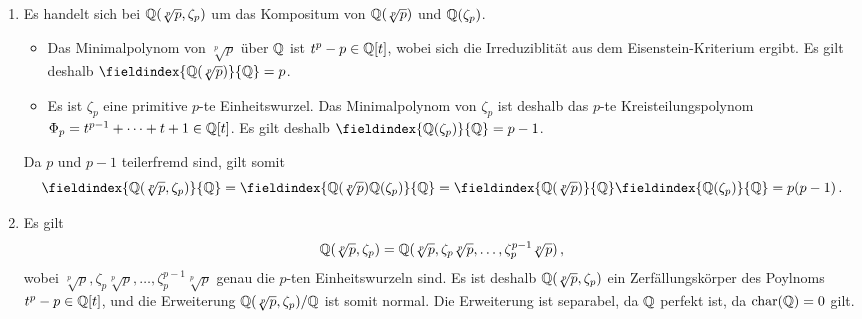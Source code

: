 \documentclass[a4paper, 10pt]{scrartcl}
\begin{document}
\begin{solution}
  \begin{enumerate}
    \item
      Es handelt sich bei $\mathbb{Q}(\sqrt[p]{p}, \zeta_p)$ um das Kompositum von $\mathbb{Q}(\sqrt[p]{p})$ und $\mathbb{Q}(\zeta_p)$.
      \begin{itemize}
        \item
          Das Minimalpolynom von $\sqrt[p]{p}$ über $\mathbb{Q}$ ist $t^p - p \in \mathbb{Q}[t]$, wobei sich die Irreduziblität aus dem Eisenstein-Kriterium ergibt.
          Es gilt deshalb $\fieldindex{\Rational(\sqrt[p]{p})}{\Rational} = p$.
        \item
          Es ist $\zeta_p$ eine primitive $p$-te Einheitswurzel.
          Das Minimalpolynom von $\zeta_p$ ist deshalb das $p$-te Kreisteilungspolynom $\Phi_p = t^{p-1} + \dotsb + t + 1 \in \mathbb{Q}[t]$.
          Es gilt deshalb $\fieldindex{\Rational(\zeta_p)}{\Rational} = p-1$.
      \end{itemize}
      Da $p$ und $p-1$ teilerfremd sind, gilt somit
      \[
          \fieldindex{\Rational(\sqrt[p]{p}, \zeta_p)}{\Rational}
        = \fieldindex{\Rational(\sqrt[p]{p}) \Rational(\zeta_p)}{\Rational}
        = \fieldindex{\Rational(\sqrt[p]{p})}{\Rational} \fieldindex{\Rational(\zeta_p)}{\Rational}
        = p(p-1) \,.
      \]
    \item
      Es gilt
      \[
          \mathbb{Q}(\sqrt[p]{p}, \zeta_p)
        = \mathbb{Q}(\sqrt[p]{p}, \zeta_p \sqrt[p]{p}, \dotsc, \zeta_p^{p-1} \sqrt[p]{p}) \,,
      \]
      wobei $\sqrt[p]{p}, \zeta_p \sqrt[p]{p}, \dotsc, \zeta_p^{p-1} \sqrt[p]{p}$ genau die $p$-ten Einheitswurzeln sind.
      Es ist deshalb $\mathbb{Q}(\sqrt[p]{p}, \zeta_p)$ ein Zerfällungskörper des Poylnoms $t^p - p \in \mathbb{Q}[t]$, und die Erweiterung $\mathbb{Q}(\sqrt[p]{p}, \zeta_p)/\mathbb{Q}$ ist somit normal.
      Die Erweiterung ist separabel, da $\mathbb{Q}$ perfekt ist, da $\operatorname{char}(\mathbb{Q}) = 0$ gilt.
  \end{enumerate}
\end{solution}
\end{document}
